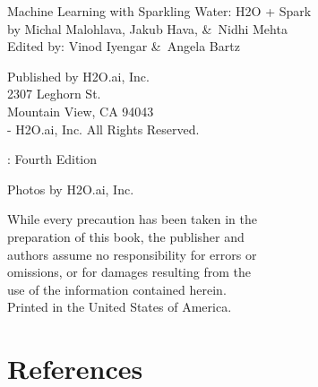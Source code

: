     {\raggedright\vfill

    Machine Learning with Sparkling Water: H2O + Spark\\
    by Michal Malohlava, Jakub Hava, \&\ Nidhi Mehta\\
    Edited by: Vinod Iyengar \&\ Angela Bartz

    \bigskip
    Published by H2O.ai, Inc. \\
    2307 Leghorn St. \\
    Mountain View, CA 94043\\
    \bigskip
    -\the\year \hspace{1pt} H2O.ai, Inc. All Rights Reserved.
    \bigskip

    \monthname \hspace{1pt}  \the\year: Fourth Edition
    \bigskip

    Photos by \textcopyright H2O.ai, Inc.
    \bigskip

    While every precaution has been taken in the\\
    preparation of this book, the publisher and\\
    authors assume no responsibility for errors or\\
    omissions, or for damages resulting from the\\
    use of the information contained herein.\\
    \bigskip
    Printed in the United States of America.


    }\par

    \newpage
    \tableofcontents

    \newpage
    

    \newpage
    

    \newpage
    

    \newpage
    

    \newpage
    

    \newpage
    

    \newpage
    

    \newpage
    

    \newpage
    

    \newpage
    

    \newpage
    

    \newpage
    

    \newpage


    \section{References}

    


